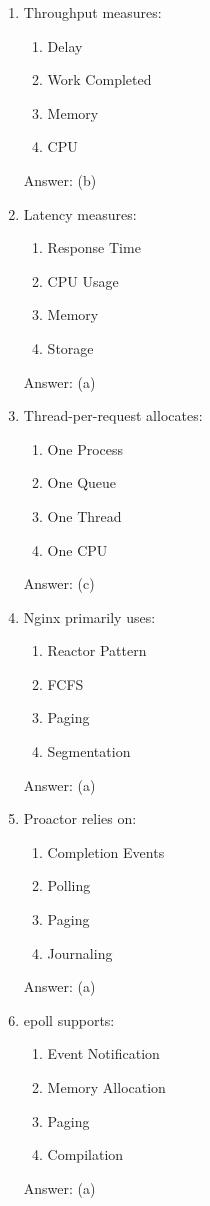 \begin{enumerate}

\item Throughput measures:
\begin{enumerate}[label=(\alph*)]
\item Delay
\item Work Completed
\item Memory
\item CPU
\end{enumerate}
Answer: (b)

\item Latency measures:
\begin{enumerate}[label=(\alph*)]
\item Response Time
\item CPU Usage
\item Memory
\item Storage
\end{enumerate}
Answer: (a)

\item Thread-per-request allocates:
\begin{enumerate}[label=(\alph*)]
\item One Process
\item One Queue
\item One Thread
\item One CPU
\end{enumerate}
Answer: (c)

\item Nginx primarily uses:
\begin{enumerate}[label=(\alph*)]
\item Reactor Pattern
\item FCFS
\item Paging
\item Segmentation
\end{enumerate}
Answer: (a)

\item Proactor relies on:
\begin{enumerate}[label=(\alph*)]
\item Completion Events
\item Polling
\item Paging
\item Journaling
\end{enumerate}
Answer: (a)

\item epoll supports:
\begin{enumerate}[label=(\alph*)]
\item Event Notification
\item Memory Allocation
\item Paging
\item Compilation
\end{enumerate}
Answer: (a)


\end{enumerate}
